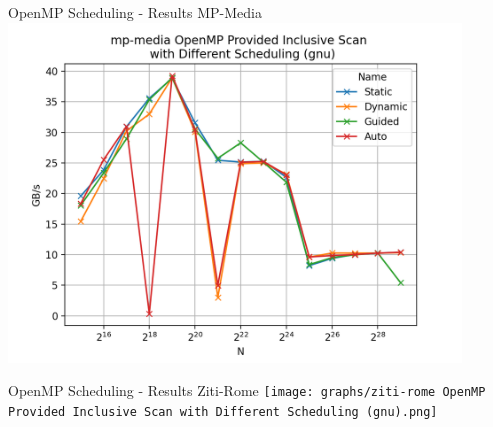 \begin{frame}{OpenMP Scheduling - Results MP-Media}
	\centering
	\vspace{-5pt}
	\includegraphics[width=0.90\textwidth]{graphs/mp-media OpenMP Provided Inclusive Scan  with Different Scheduling (gnu).png}
\end{frame}

\begin{frame}{OpenMP Scheduling - Results Ziti-Rome}
	\centering
	\vspace{-5pt}
	\texttt{[image: graphs/ziti-rome OpenMP Provided Inclusive Scan  with Different Scheduling (gnu).png]}
\end{frame}